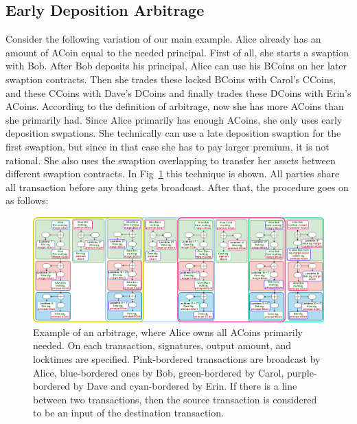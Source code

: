 
\subsection{Early Deposition Arbitrage}
\label{sec:line_arb}

Consider the following variation of our main example. Alice already has an amount of ACoin equal to the needed principal. First of all, she starts a swaption with Bob. After Bob deposits his principal, Alice can use his BCoins on her later swaption contracts. Then she trades these locked BCoins with Carol's CCoins, and these CCoins with Dave's DCoins and finally trades these DCoins with Erin's ACoins. According to the definition of arbitrage, now she has more ACoins than she primarily had. Since Alice primarily has enough ACoins, she only uses early deposition swpations. She technically can use a late deposition swaption for the first swaption, but since in that case she has to pay larger premium, it is not rational.
She also uses the swaption overlapping to transfer her assets between different swaption contracts. 
In Fig~\ref{fig:line_arb} this technique is shown. All parties share all transaction before any thing gets broadcast. After that, the procedure goes on as follows:

\begin{figure}
    \centering
    \includegraphics[width=\textwidth]{figures/arbitrage1-fateme.png}
    \caption{Example of an arbitrage, where Alice owns all ACoins primarily needed. On each transaction, signatures, output amount, and locktimes are specified. Pink-bordered transactions are broadcast by Alice, blue-bordered ones by Bob, green-bordered by Carol, purple-bordered by Dave and cyan-bordered by Erin. If there is a line between two transactions, then the source transaction is considered to be an input of the destination transaction.}
    \label{fig:line_arb}
\end{figure}

